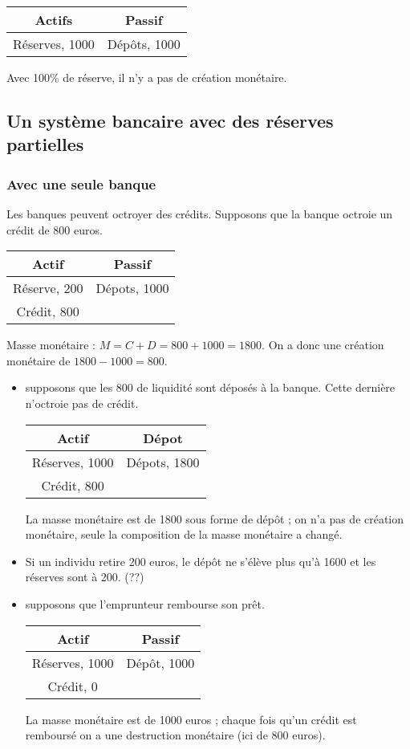 	\begin{tabular}{c|c}
	Actifs & Passif \\ 
	\hline 
	Réserves, 1000 & Dépôts, 1000
	\end{tabular} 
	
	Avec 100\% de réserve, il n'y a pas de création monétaire.
	
	\subsection{Un système bancaire avec des réserves partielles}
	
	\subsubsection{Avec une seule banque}
	
	Les banques peuvent octroyer des crédits. Supposons que la banque octroie un crédit de 800 euros.
	
	\begin{tabular}{c|c}
	Actif & Passif \\ 
	\hline 
	Réserve, 200 & Dépots, 1000 \\ 
	Crédit, 800 & 
	\end{tabular} 
	
	Masse monétaire : $M = C + D = 800+  1000 = 1800$. On a donc une création monétaire de $1800 - 1000 = 800$.
	
	\begin{itemize}
		\item supposons que les 800 de liquidité sont déposés à la banque. Cette dernière n'octroie pas de crédit.
		
		\begin{tabular}{c|c}
		Actif & Dépot \\ 
		\hline 
		Réserves, 1000 & Dépots, 1800 \\ 
		Crédit, 800 &  
		\end{tabular} 
		
		La masse monétaire est de 1800 sous forme de dépôt ; on n'a pas de création monétaire, seule la composition de la masse monétaire a changé.
		
		\item Si un individu retire 200 euros, le dépôt ne s'élève plus qu'à 1600 et les réserves sont à 200. (??)
		
		\item supposons que l'emprunteur rembourse son prêt.
		
		\begin{tabular}{c|c}
		Actif & Passif \\ 
		\hline 
		Réserves, 1000 & Dépôt, 1000 \\ 
		Crédit, 0 & 
		\end{tabular}
		
		La masse monétaire est de 1000 euros ; chaque fois qu'un crédit est remboursé on a une destruction monétaire (ici de 800 euros).
	\end{itemize}
	
